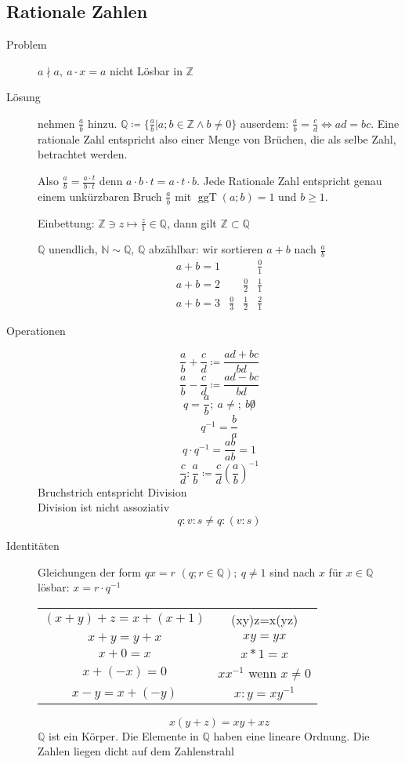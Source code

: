 \documentclass[12pt,a4paper]{article}
\DeclareMathOperator\ggt{ggT}
\begin{document}
\subsection{Rationale Zahlen}
\begin{description}
	\item[Problem] $a \nmid a,\ a \cdot x = a$ nicht Lösbar in $\mathbb{Z}$
	\item[Lösung] nehmen $\frac{a}{b}$ hinzu. $\mathbb{Q} \coloneqq \lbrace \frac{a}{b} | a;b \in \mathbb{Z} \wedge b \not = 0 \rbrace$ auserdem: $\frac{a}{b} = \frac{c}{d} \Leftrightarrow ad = bc$. Eine rationale Zahl entspricht also einer Menge von Brüchen, die als selbe Zahl, betrachtet werden.

		Also $\frac{a}{b} = \frac{a \cdot t}{b \cdot t}$ denn $a \cdot b \cdot t = a \cdot t \cdot b$. Jede Rationale Zahl entspricht genau einem unkürzbaren Bruch $\frac{a}{b}$ mit $\ggt(a;b) = 1$ und $b \geq 1$.

		Einbettung: $\mathbb{Z}\ni z \longmapsto \frac{z}{1} \in \mathbb{Q}$, dann gilt $\mathbb{Z} \subset \mathbb{Q}$

		$\mathbb{Q}$ unendlich, $\mathbb{N} \sim \mathbb{Q}$, $\mathbb{Q}$ abzählbar: wir sortieren $a + b$ nach $\frac{a}{b}$
		$$\begin{array}{lccc}
				a + b = 1 &             &             & \frac{0}{1} \\
				a + b = 2 &             & \frac{0}{2} & \frac{1}{1} \\
				a + b = 3 & \frac{0}{3} & \frac{1}{2} & \frac{2}{1}
			\end{array}$$
	\item[Operationen]
		$$\frac{a}{b} + \frac{c}{d} \coloneqq \frac{ad+bc}{bd}$$
		$$\frac{a}{b} - \frac{c}{d} \coloneqq \frac{ad-bc}{bd}$$
		$$q = \frac{a}{b};\ a \not =;\ b \not 0$$
		$$q^{-1} = \frac{b}{a}$$
		$$q \cdot q^{-1} = \frac{ab}{ab} = 1$$
		$$\frac{c}{d}:\frac{a}{b}\coloneqq\frac{c}{d}  \left(\frac{a}{b}\right)^{-1}$$
		Bruchstrich entspricht Division \\
		Division ist nicht assoziativ
		$$q:v:s \not = q:(v:s)$$
	\item[Identitäten] Gleichungen der form $qx=r$ $(q;r \in \mathbb{Q});\ q \not = 1$ sind nach $x$ für $x\in \mathbb{Q}$ lösbar: $x = r \cdot q^{-1}$ \\
		\begin{tabular}[t]{cc}
			$(x+y)+z = x+(x+1)$ & (xy)z=x(yz)                 \\
			$x + y = y + x$     & $xy = yx$                   \\
			$x + 0 = x$         & $x * 1 = x$                 \\
			$x + (-x) = 0$      & $xx^{-1}$ wenn $x \not = 0$ \\
			$x - y = x + (-y)$  & $x:y = xy^{-1}$
		\end{tabular}
		$$x(y+z) = xy + xz$$
		$\mathbb{Q}$ ist ein Körper. Die Elemente in $\mathbb{Q}$ haben eine  lineare Ordnung. Die Zahlen liegen dicht auf dem Zahlenstrahl
\end{description}
\end{document}
